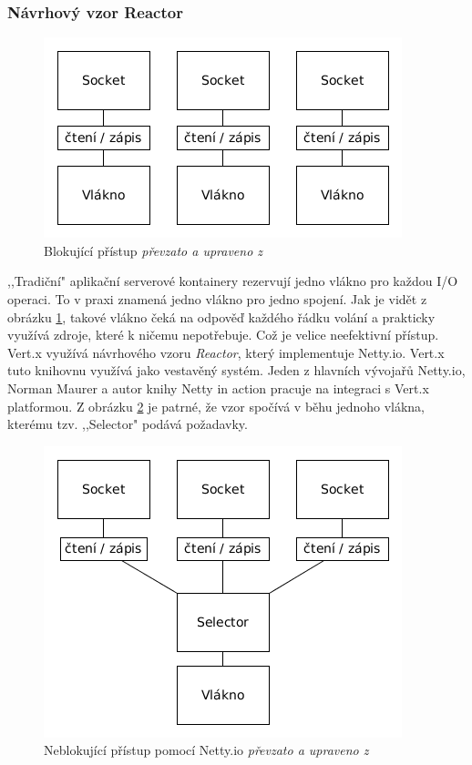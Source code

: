 \subsubsection{Návrhový vzor Reactor}

\begin{figure}[h]
\begin{centering}
\includegraphics[scale=0.55]{obrazky/blocking_pattern}
\par\end{centering}
\caption{Blokující přístup \emph{převzato a upraveno z \cite{nettyInAction}}\label{fig:blocking_pattern}}
\end{figure}

,,Tradiční" aplikační serverové kontainery rezervují jedno vlákno pro každou I/O operaci. To v praxi znamená jedno vlákno pro jedno spojení. Jak je vidět z obrázku \ref{fig:blocking_pattern}, takové vlákno čeká na odpověď každého řádku volání a prakticky využívá zdroje, které k ničemu nepotřebuje. Což je velice neefektivní přístup. Vert.x využívá návrhového vzoru \emph{Reactor}, který implementuje Netty.io. Vert.x tuto knihovnu využívá jako vestavěný systém. Jeden z hlavních vývojařů Netty.io, Norman Maurer a autor knihy Netty in action \cite{nettyInAction} pracuje na integraci s Vert.x platformou. Z obrázku \ref{fig:vertx_pattern} je patrné, že vzor spočívá v běhu jednoho vlákna, kterému tzv. ,,Selector" podává požadavky.

\begin{figure}[h]
\begin{centering}
\includegraphics[scale=0.55]{obrazky/vertx_pattern}
\par\end{centering}
\caption{Neblokující přístup pomocí Netty.io \emph{převzato a upraveno z \cite{nettyInAction}}\label{fig:vertx_pattern}}
\end{figure}

